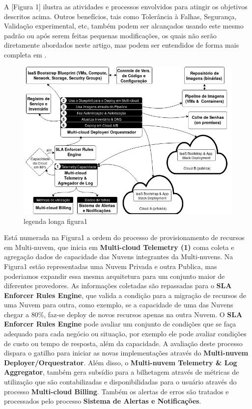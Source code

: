\documentclass[12pt]{article}
\begin{document}
	A [Figura 1] ilustra as atividades e processos envolvidos para atingir os objetivos descritos acima. Outros benefícios, tais como Tolerância à Falhas, Segurança, Validação experimental, etc, também podem ser alcançados usando este mesmo padrão ou após serem feitas pequenas modificações, os quais não serão diretamente abordados neste artigo, mas podem ser entendidos de forma mais completa em \cite{Fisher:2018}.
		
	\begin{figure}[H]
		\centering
		\includegraphics[width=0.9\linewidth]{figuras/Figure1.png}
		\caption{legenda longa figura1}
		\label{fig:figure1}
	\end{figure}
	
	Está numerada na Figura1 a ordem do processo de provisionamento de recursos em Multi-nuvem, que inicia em \textbf{Multi-cloud Telemetry (1)} coma coleta e agregação dados de capacidade das Nuvens integrantes da Multi-nuvens. Na Figura1 estão representadas uma Nuvem Privada e outra Publica, mas poderiamos expandir essa mesma arquitetura para um conjunto maior de diferentes provedores. As informações coletadas são repassadas para o \textbf{SLA Enforcer Rules Engine}, que valida a condição para a migração de recursos de uma Nuvem para outra, como exemplo, se a capacidade de uma das Nuvens chegar a 80\%, faz-se deploy de novos recursos apenas na outra Nuvem. O \textbf{SLA Enforcer Rules Engine} pode avaliar um conjunto de condições que se faça adequado para cada negócio ou situação, por exemplo ele pode avaliar condições de custo ou tempo de resposta, além da capacidade. A avaliação deste processo dispara o gatilho para iniciar as novas implementações através do \textbf{Multi-nuvem Deployer/Orquestrator}. Além disso, o \textbf{Multi-nuvem Telemetry \& Log Aggregator}, também gera subsídio para a bilhetagem através de métricas de utilização que são contabilizadas e disponibilidadas para o usuário através do processo \textbf{Multi-cloud Billing}. Também os alertas de erros são tratados e processados pelo processo \textbf{Sistema de Alertas e Notificações}.
	
\end{document}
